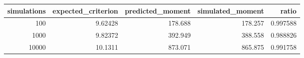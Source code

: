 \begin{tabular}{rrrrr}
\toprule
simulations & expected_criterion & predicted_moment & simulated_moment & ratio \\
\midrule
100 & 9.62428 & 178.688 & 178.257 & 0.997588 \\
1000 & 9.82372 & 392.949 & 388.558 & 0.988826 \\
10000 & 10.1311 & 873.071 & 865.875 & 0.991758 \\
\bottomrule
\end{tabular}
